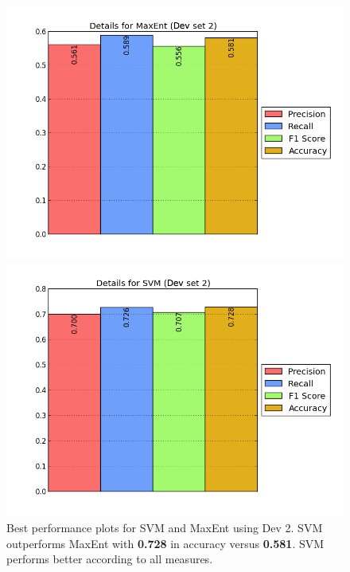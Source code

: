 \begin{figure}[t!]
	\centering
	\begin{minipage}{.45\linewidth}
		\includegraphics[width=\linewidth]{../img/plots/analysis/maxent_stats_best_diff_test.png}
	\end{minipage}
	\hspace{0.05\linewidth}
	\begin{minipage}{.45\linewidth}
		\includegraphics[width=\linewidth]{../img/plots/analysis/svm_stats_best_diff_test.png}
	\end{minipage}
	\caption[Best performance plots for SVM and MaxEnt for dev set 2]{Best performance plots for SVM and MaxEnt using Dev 2. SVM outperforms MaxEnt with \textbf{0.728} in accuracy versus \textbf{0.581}. SVM performs better according to all measures.}
	\label{fig:best_result_testset2}
\end{figure}

